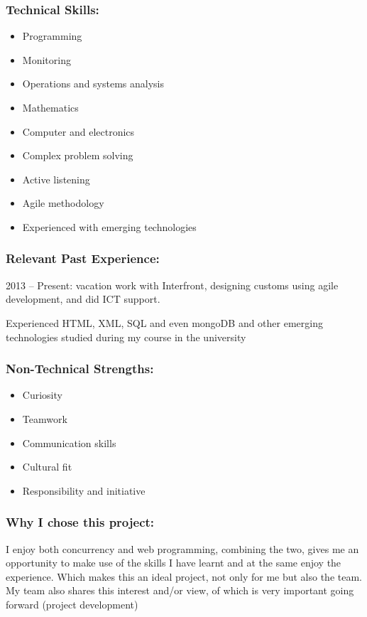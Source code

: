 \subsubsection{Technical Skills:}
	\begin{itemize}
		\item Programming
		\item Monitoring
		\item Operations and systems analysis
		\item Mathematics
		\item Computer and electronics 
		\item Complex problem solving
		\item Active listening
		\item Agile methodology
		\item Experienced with emerging technologies
	\end{itemize}
	
\subsubsection{Relevant Past Experience:}
\par{2013 – Present: vacation work with Interfront, designing customs using agile development, and did ICT support.
}
\par{Experienced HTML, XML, SQL and even mongoDB and other emerging technologies studied during my course in the university
}
\subsubsection{Non-Technical Strengths:}
\begin{itemize}
		\item Curiosity
		\item Teamwork
		\item Communication skills
		\item Cultural fit
		\item Responsibility and initiative
	\end{itemize}
\subsubsection{Why I chose this project:}
\par{I enjoy both concurrency and web programming, combining the two, gives me an opportunity to make use of the skills I have learnt and at the same enjoy the experience. Which makes this an ideal project, not only for me but also the team. My team also shares this interest and/or view, of which is very important going forward (project development)
}
\newpage
